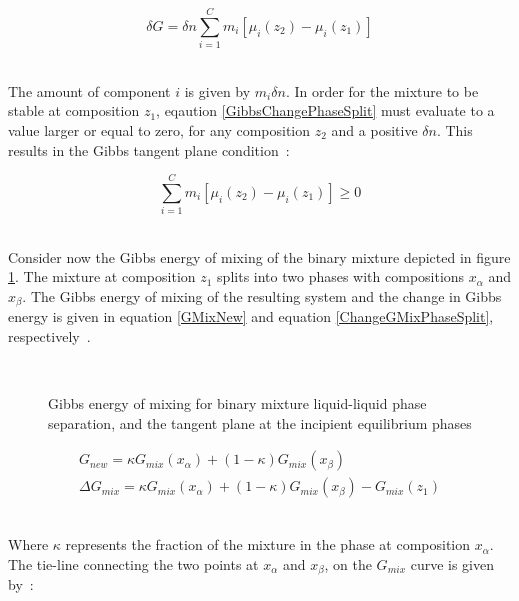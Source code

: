 \begin{equation}
\delta G = \delta n \sum_{i = 1}^{C} m_{i}\left[\mu_{i}\left(z_{2}\right) - \mu_{i}\left(z_{1}\right)\right] \label{GibbsChangePhaseSplit}
\end{equation}\

The amount of component $i$ is given by $m_{i} \delta n$. In order for the mixture to be stable at composition $z_{1}$, eqaution \ref{GibbsChangePhaseSplit} must evaluate to a value larger or equal to zero, for any composition $z_{2}$ and a positive $\delta n$. This results in the Gibbs tangent plane condition~\cite{ThermodynamicModels}:\

\begin{equation}
\sum_{i = 1}^{C} m_{i}\left[\mu_{i}\left(z_{2}\right) - \mu_{i}\left(z_{1}\right)\right] \geq 0 \label{GibbsTangentPlaneCondition}
\end{equation}\

Consider now the Gibbs energy of mixing of the binary mixture depicted in figure \ref{TangentPlaneAnalysisDrawing}. The mixture at composition $z_{1}$ splits into two phases with compositions $x_{\alpha}$ and $x_{\beta}$. The Gibbs energy of mixing of the resulting system and the change in Gibbs energy is given in equation \ref{GMixNew} and equation \ref{ChangeGMixPhaseSplit}, respectively~\cite{ThermodynamicModels}.\


\begin{figure}[t]
\begin{center}
\resizebox{0.7\textwidth}{!}{}\\
\end{center}
\caption{Gibbs energy of mixing for binary mixture liquid-liquid phase separation, and the tangent plane at the incipient equilibrium phases} \label{TangentPlaneAnalysisDrawing}
\end{figure}	

\begin{eqnarray}
G_{new} = \kappa G_{mix}\left(x_{\alpha}\right) + \left(1-\kappa\right)G_{mix}\left(x_{\beta}\right) \label{GMixNew}\\
\Delta G_{mix} = \kappa G_{mix}\left(x_{\alpha}\right) + \left(1-\kappa\right)G_{mix}\left(x_{\beta}\right) - G_{mix}\left(z_{1}\right) \label{ChangeGMixPhaseSplit}
\end{eqnarray}\

Where $\kappa$ represents the fraction of the mixture in the phase at composition $x_{\alpha}$. The tie-line connecting the two points at $x_{\alpha}$ and $x_{\beta}$, on the $G_{mix}$ curve is given by~\cite{ThermodynamicModels}:\

